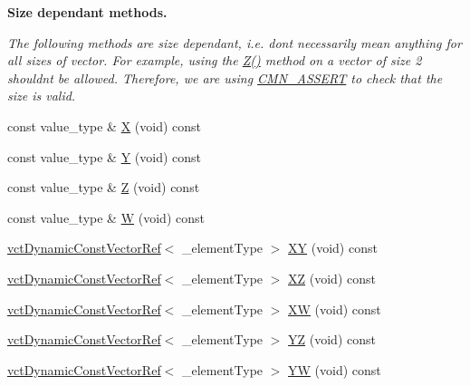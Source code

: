 \begin{Indent}{\bf Size dependant methods.}\par
{\em The following methods are size dependant, i.\+e. don\textquotesingle{}t necessarily mean anything for all sizes of vector. For example, using the \hyperlink{classvct_dynamic_const_vector_base_a8f882cd25d9c932945f5236436924fcf}{Z()} method on a vector of size 2 shouldn\textquotesingle{}t be allowed. Therefore, we are using \hyperlink{group__cisst_common_ga6a12b7031ea38ac5bf5937b8633c97ff}{C\+M\+N\+\_\+\+A\+S\+S\+E\+R\+T} to check that the size is valid. }\begin{DoxyCompactItemize}
\item 
const value\+\_\+type \& \hyperlink{classvct_dynamic_const_vector_base_ae48d3b96ad2a924d48d1667f4e03156d}{X} (void) const 
\item 
const value\+\_\+type \& \hyperlink{classvct_dynamic_const_vector_base_aac9f4d42ffdb53be61fd3520aaed24a9}{Y} (void) const 
\item 
const value\+\_\+type \& \hyperlink{classvct_dynamic_const_vector_base_a8f882cd25d9c932945f5236436924fcf}{Z} (void) const 
\item 
const value\+\_\+type \& \hyperlink{classvct_dynamic_const_vector_base_a4213d8edb802ea8948e62874da796762}{W} (void) const 
\item 
\hyperlink{classvct_dynamic_const_vector_ref}{vct\+Dynamic\+Const\+Vector\+Ref}$<$ \+\_\+element\+Type $>$ \hyperlink{classvct_dynamic_const_vector_base_add731c945a268967857a0670e0f1a89d}{X\+Y} (void) const 
\item 
\hyperlink{classvct_dynamic_const_vector_ref}{vct\+Dynamic\+Const\+Vector\+Ref}$<$ \+\_\+element\+Type $>$ \hyperlink{classvct_dynamic_const_vector_base_a8b22fdde3369fb5742b4bb98f1eb83cc}{X\+Z} (void) const 
\item 
\hyperlink{classvct_dynamic_const_vector_ref}{vct\+Dynamic\+Const\+Vector\+Ref}$<$ \+\_\+element\+Type $>$ \hyperlink{classvct_dynamic_const_vector_base_a1577e0a5abc6f5348dbf6787896b490f}{X\+W} (void) const 
\item 
\hyperlink{classvct_dynamic_const_vector_ref}{vct\+Dynamic\+Const\+Vector\+Ref}$<$ \+\_\+element\+Type $>$ \hyperlink{classvct_dynamic_const_vector_base_a3d2c554ea19295b3139737ed45edf819}{Y\+Z} (void) const 
\item 
\hyperlink{classvct_dynamic_const_vector_ref}{vct\+Dynamic\+Const\+Vector\+Ref}$<$ \+\_\+element\+Type $>$ \hyperlink{classvct_dynamic_const_vector_base_ab37fb7ec7ac657f4d07229cf7e0390cf}{Y\+W} (void) const 

\end{DoxyCompactItemize}
\end{Indent}
